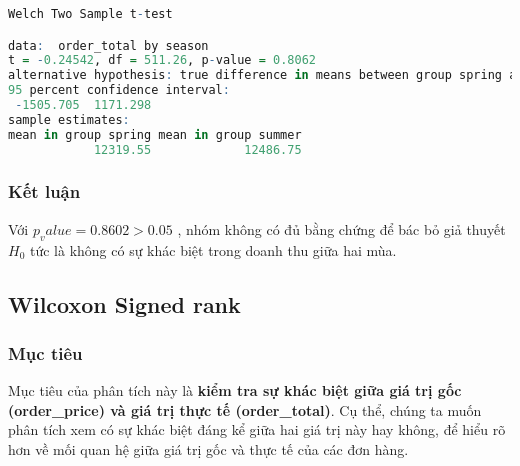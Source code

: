\begin{lstlisting}[language=R, caption= Kết quả t-test]
		Welch Two Sample t-test

data:  order_total by season
t = -0.24542, df = 511.26, p-value = 0.8062
alternative hypothesis: true difference in means between group spring and group summer is not equal to 0
95 percent confidence interval:
 -1505.705  1171.298
sample estimates:
mean in group spring mean in group summer 
            12319.55             12486.75 
\end{lstlisting}

\subsubsection{Kết luận}
\begin{boxH}

Với $p_value = 0.8602 > 0.05$ , nhóm không có đủ bằng chứng để bác bỏ giả thuyết $H_0$ tức là không có sự khác biệt trong doanh thu giữa hai mùa.

\end{boxH}

\subsection{Wilcoxon Signed rank}
\subsubsection{Mục tiêu}
Mục tiêu của phân tích này là \textbf{kiểm tra sự khác biệt giữa giá trị gốc (order\_price) và giá trị thực tế (order\_total)}. Cụ thể, chúng ta muốn phân tích xem có sự khác biệt đáng kể giữa hai giá trị này hay không, để hiểu rõ hơn về mối quan hệ giữa giá trị gốc và thực tế của các đơn hàng.

